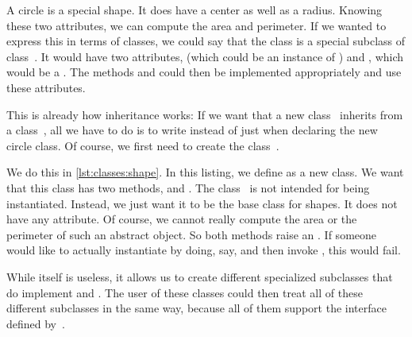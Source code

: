 A circle is a special shape.
It does have a center as well as a radius.
Knowing these two attributes, we can compute the area and perimeter.
If we wanted to express this in terms of classes, we could say that the class  is a special subclass of class~.
It would have two attributes,  (which could be an instance of ) and , which would be a .
The methods  and  could then be implemented appropriately and use these attributes.

This is already how inheritance works:
If we want that a new class~ inherits from a class~, all we have to do is to write  instead of just  when declaring the new circle class.
Of course, we first need to create the class~.

We do this in \cref{lst:classes:shape}.
In this listing, we define  as a new class.
We want that this class has two methods,  and .
The class~ is not intended for being instantiated.
Instead, we just want it to be the base class for  shapes.
It does not have any attribute.
Of course, we cannot really compute the area or the perimeter of such an abstract object.
So both methods raise an .
If someone would like to actually instantiate  by doing, say,  and then invoke , this would fail.

While  itself is useless, it allows us to create different specialized subclasses that do implement  and .
The user of these classes could then treat all of these different subclasses in the same way, because all of them support the interface defined by~.

